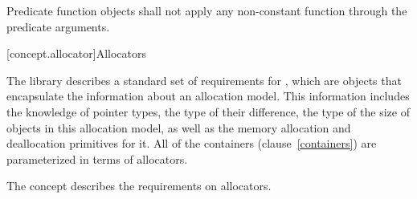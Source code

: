 \documentclass[american,twoside]{book}
\begin{document}
\textcolor{addclr}{\pnum}
Predicate function objects shall not apply any non-constant function
through the predicate arguments.

\color{black}
[concept.allocator]{Allocators}
%

\pnum
The library describes a standard set of requirements for ,
which are objects that encapsulate the information about an allocation model.
This information includes the knowledge of pointer types, the type of their
difference, the type of the size of objects in this allocation model, as well
as the memory allocation and deallocation primitives for it. All of the
containers (clause~\ref{containers}) are parameterized in terms of allocators.



\pnum
{}
{The \mbox{} concept describes the requirements on
  allocators.} 
\end{document}
